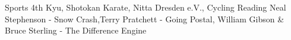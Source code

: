   \begin{cvskills} 
     	 \cvskill
      		{Sports}
		{4th Kyu, Shotokan Karate, Nitta Dresden e.V., Cycling}
	 \cvskill
		{Reading}
		{Neal Stephenson - Snow Crash,\quad Terry Pratchett - Going Postal,
		  \newline
		  William Gibson \& Bruce Sterling - The Difference Engine}
  \end{cvskills}
